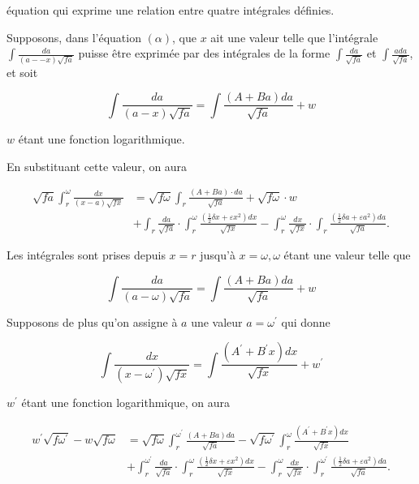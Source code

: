 \documentclass{article}
\begin{document}
équation qui exprime une relation entre quatre intégrales définies.

Supposons, dans l'équation \((\alpha)\), que \(x\) ait une valeur telle que l'intégrale \(\int \frac{d a}{(a--x) \sqrt{f a}}\) puisse être exprimée par des intégrales de la forme \(\int \frac{d a}{\sqrt{f a}}\) et \(\int \frac{a d a}{\sqrt{f a}}\), et soit

\[
\int \frac{d a}{(a-x) \sqrt{f a}}=\int \frac{(A+B a) d a}{\sqrt{f a}}+w
\]

\(w\) étant une fonction logarithmique.

En substituant cette valeur, on aura

\[
\begin{aligned}
\sqrt{f a} \int_{r}^{\omega} \frac{d x}{(x-a) \sqrt{f x}} & =\sqrt{f \omega} \int_{r} \frac{(A+B a) \cdot d a}{\sqrt{f a}}+\sqrt{f \omega} \cdot w \\
& +\int_{r} \frac{d a}{\sqrt{f a}} \cdot \int_{r}^{\omega} \frac{\left(\frac{1}{2} \delta x+\varepsilon x^{2}\right) d x}{\sqrt{f x}}-\int_{r}^{\omega} \frac{d x}{\sqrt{f x}} \cdot \int_{r} \frac{\left(\frac{1}{2} \delta a+\varepsilon a^{2}\right) d a}{\sqrt{f a}} .
\end{aligned}
\]

Les intégrales sont prises depuis \(x=r\) jusqu'à \(x=\omega, \omega\) étant une valeur telle que

\[
\int \frac{d a}{(a-\omega) \sqrt{f a}}=\int \frac{(A+B a) d a}{\sqrt{f a}}+w
\]

Supposons de plus qu'on assigne à \(a\) une valeur \(a=\omega^{\prime}\) qui donne

\[
\int \frac{d x}{\left(x-\omega^{\prime}\right) \sqrt{f x}}=\int \frac{\left(A^{\prime}+B^{\prime} x\right) d x}{\sqrt{f x}}+w^{\prime}
\]

\(w^{\prime}\) étant une fonction logarithmique, on aura

\[
\begin{aligned}
w^{\prime} \sqrt{f \omega^{\prime}}-w \sqrt{f \omega} & =\sqrt{f \omega} \int_{r}^{\omega^{\prime}} \frac{(A+B a) d a}{\sqrt{f a}}-\sqrt{f \omega^{\prime}} \int_{r}^{\omega} \frac{\left(A^{\prime}+B^{\prime} x\right) d x}{\sqrt{f x}} \\
& +\int_{r}^{\omega^{\prime}} \frac{d a}{\sqrt{f a}} \cdot \int_{r}^{\omega} \frac{\left(\frac{1}{2} \delta x+\varepsilon x^{2}\right) d x}{\sqrt{f x}}-\int_{r}^{\omega} \frac{d x}{\sqrt{f x}} \cdot \int_{r}^{\omega^{\prime}} \frac{\left(\frac{1}{2} \delta a+\varepsilon a^{2}\right) d a}{\sqrt{f a}} .
\end{aligned}
\]
\end{document}

